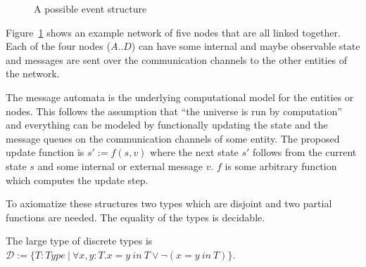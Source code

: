 \begin{figure}[ht]
  \centering
  \caption{A possible event structure}
  \label{fig:structure}
\end{figure}

Figure~\ref{fig:structure} shows an example network of five nodes that
are all linked together. Each of the four nodes ($A..D$) can have some internal
and maybe observable state and messages are sent over the communication channels
to the other entities of the network. 

The message automata is the underlying computational model for the entities or
nodes. This follows the assumption that ``the universe is run by
computation''~\cite{bickford2005causal} and everything can be modeled
by functionally updating the state and the message queues on the communication
channels of some entity. The proposed update function is $s':=f(s,v)$ where
the next state $s'$ follows from the current state $s$ and some internal or
external message $v$. $f$ is some arbitrary function which computes
the update step.~\cite{bickford2005causal}

To axiomatize these structures two types which are disjoint and two partial
functions are needed. The equality of the types is decidable.

\begin{defi}
  The large type of discrete types is
  $\mathcal{D}:=\{T:Type\ |\ \forall x,y:T.x=y\ in\ T\vee\neg (x=y\ in\ T)\}$.
  \textnormal{~\cite{bickford2005causal}}
\end{defi}

